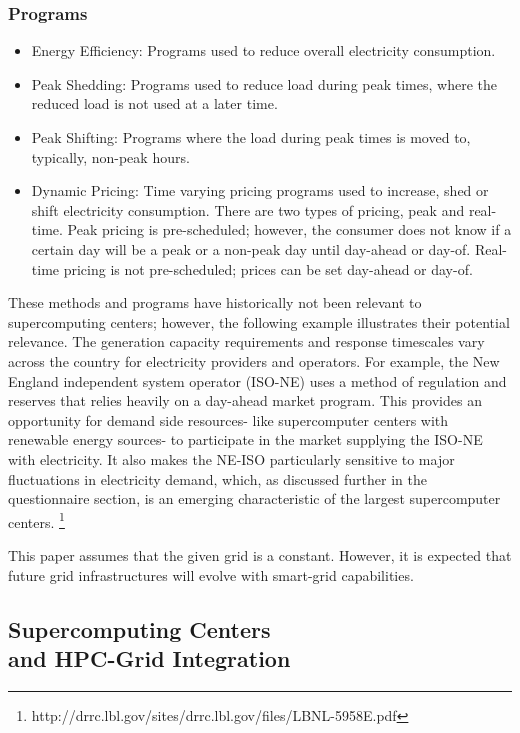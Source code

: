 \subsubsection{Programs}
\begin{itemize}
\item Energy Efficiency:  Programs used to reduce overall electricity consumption.
\item Peak Shedding:  Programs used to reduce load during peak times, 
where the reduced load is not used at a later time. 
\item Peak Shifting:  Programs where the load during peak times is moved to, typically, non-peak hours. 
\item Dynamic Pricing:  Time varying pricing programs used to increase, shed or shift electricity consumption. 
There are two types of pricing, peak and real-time.  Peak pricing is pre-scheduled; however, the consumer 
does not know if a certain day will be a peak or a non-peak day until day-ahead or day-of.  
Real-time pricing is not pre-scheduled; prices can be set day-ahead or day-of.
\end{itemize}

These methods and programs have historically not been relevant to supercomputing centers; however, 
the following example illustrates their potential relevance.
The generation capacity requirements and response timescales vary across the country for electricity 
providers and operators. For example, the New England independent system operator (ISO-NE) uses a method 
of regulation and reserves that relies heavily on a day-ahead market program. This provides an opportunity 
for demand side resources- like supercomputer centers with renewable energy sources- to participate in the 
market supplying the ISO-NE with electricity.  It also makes the NE-ISO particularly sensitive to major 
fluctuations in electricity demand, which, as discussed further in the questionnaire section, is an emerging 
characteristic of the largest supercomputer centers.  
\footnote {http://drrc.lbl.gov/sites/drrc.lbl.gov/files/LBNL-5958E.pdf}

This paper assumes that the given grid is a constant. However, it is expected that future grid infrastructures will 
evolve with smart-grid capabilities. 

\subsection{Supercomputing Centers\\
and HPC-Grid Integration}

